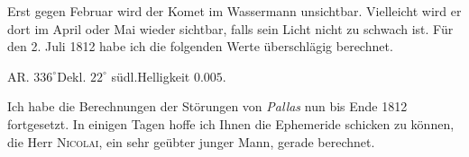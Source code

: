 \noindent Erst gegen Februar wird der Komet im Wassermann unsichtbar. Vielleicht wird er dort im April oder Mai wieder sichtbar, falls sein Licht nicht zu schwach ist. Für den 2. Juli 1812 habe ich die folgenden Werte überschlägig berechnet.
\begin{center}AR. $336^\circ$\quad Dekl. $22^\circ$ südl.\quad Helligkeit $0.005$.\end{center}
\par{}

\par\indent Ich habe die Berechnungen der Störungen von \emph{Pallas} nun bis Ende 1812 fortgesetzt. In einigen Tagen hoffe ich Ihnen die Ephemeride schicken zu können, die Herr \textsc{Nicolai}, ein sehr geübter junger Mann, gerade berechnet.
